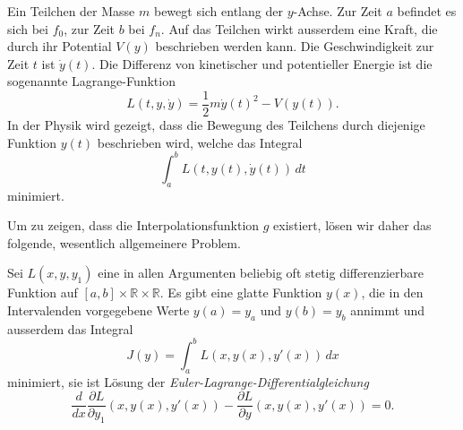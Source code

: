 \begin{beispiel}
Ein Teilchen der Masse $m$ bewegt sich entlang der $y$-Achse.
Zur Zeit $a$ befindet es sich bei $f_0$, zur Zeit $b$ bei $f_n$.
Auf das Teilchen wirkt ausserdem eine Kraft, die durch ihr Potential $V(y)$
beschrieben werden kann.
Die Geschwindigkeit zur Zeit $t$ ist $\dot y(t)$.
Die Differenz von kinetischer und potentieller Energie ist
die sogenannte Lagrange-Funktion
\begin{equation}
L(t,y,\dot{y})
=
\frac12m\dot{y}(t)^2
-
V(y(t)).
\label{buch:equation:mechlagrange}
\end{equation}
In der Physik wird gezeigt, dass die Bewegung des Teilchens durch diejenige
Funktion $y(t)$ beschrieben wird, welche das Integral
\[
\int_a^b L(t,y(t),\dot{y}(t))\,dt
\]
minimiert.
\end{beispiel}

Um zu zeigen, dass die Interpolationsfunktion $g$ existiert, lösen
wir daher das folgende, wesentlich allgemeinere Problem.

\begin{satz}
\label{buch:satz:eulerlagrange}
Sei $L(x,y,y_1)$ eine in allen Argumenten beliebig oft stetig differenzierbare
Funktion auf $[a,b]\times \mathbb R \times \mathbb R$.
Es gibt eine glatte Funktion $y(x)$, die in den Intervalenden vorgegebene
Werte $y(a)=y_a$ und $y(b)=y_b$ annimmt und ausserdem das Integral
\[
J(y)
=
\int_a^b L(x, y(x), y'(x) ) \,dx
\]
minimiert,
sie ist Lösung der {\em Euler-Lagrange-Differentialgleichung}
\begin{equation}
\frac{d}{dx} \frac{\partial L}{\partial y_1} (x,y(x),y'(x))
-
\frac{\partial L}{\partial y} (x,y(x),y'(x))
=
0.
\label{buch:variation:eulerlagrange}
\end{equation}
\end{satz}

